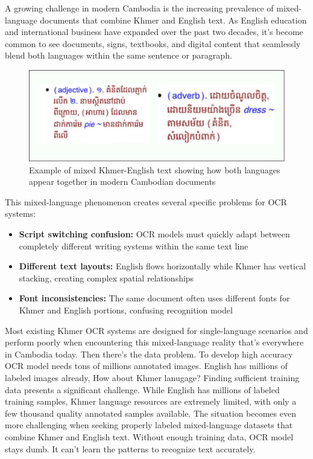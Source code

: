 A growing challenge in modern Cambodia is the increasing prevalence of mixed-language 
documents that combine Khmer and English text. As English education and international 
business have expanded over the past two decades, it's become common to see documents, 
signs, textbooks, and digital content that seamlessly blend both languages within the 
same sentence or paragraph.

\begin{figure}[H]
    \centering
    \includegraphics[width=\textwidth]{figures/mix_language_khmer_and_english.png}
    \caption{Example of mixed Khmer-English text showing how both languages appear together in modern Cambodian documents}
    \label{fig:mix_language}
\end{figure}

This mixed-language phenomenon creates several specific problems for OCR systems:
\begin{itemize}
    \item \textbf{Script switching confusion:} OCR models must quickly adapt between completely different writing systems within the same text line
    \item \textbf{Different text layouts:} English flows horizontally while Khmer has vertical stacking, creating complex spatial relationships
    \item \textbf{Font inconsistencies:} The same document often uses different fonts for Khmer and English portions, confusing recognition model
\end{itemize}

Most existing Khmer OCR systems are designed for single-language scenarios 
and perform poorly when encountering this mixed-language reality 
that's everywhere in Cambodia today. Then there's the data problem. To develop high 
accuracy OCR model needs tons of millions annotated images. English has millions 
of labeled images already, How about Khmer lanugage? 
Finding sufficient training data presents a significant challenge. 
While English has millions of labeled training samples, Khmer language 
resources are extremely limited, with only a few thousand quality annotated 
samples available. The situation becomes even more challenging when seeking 
properly labeled mixed-language datasets that combine Khmer and English text. Without enough 
training data, OCR model stays dumb. It can't learn the 
patterns to recognize text accurately.

